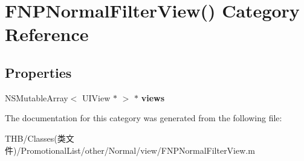\hypertarget{category_f_n_p_normal_filter_view_07_08}{}\section{F\+N\+P\+Normal\+Filter\+View() Category Reference}
\label{category_f_n_p_normal_filter_view_07_08}
\subsection*{Properties}
\begin{DoxyCompactItemize}
\item 
\mbox{\label{category_f_n_p_normal_filter_view_07_08_adbbfa079c5c7d3b5e655576a00013f12}} 
N\+S\+Mutable\+Array$<$ U\+I\+View $\ast$ $>$ $\ast$ {\bfseries views}
\end{DoxyCompactItemize}


The documentation for this category was generated from the following file\+:\begin{DoxyCompactItemize}
\item 
T\+H\+B/\+Classes(类文件)/\+Promotional\+List/other/\+Normal/view/F\+N\+P\+Normal\+Filter\+View.\+m\end{DoxyCompactItemize}
